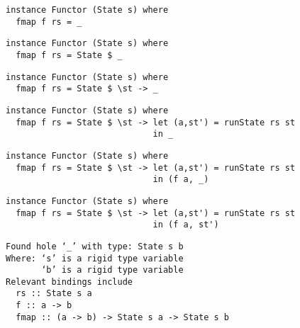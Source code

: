 \documentclass{beamer}
\begin{document}
\begin{frame}[fragile]
\begin{overprint}
\begin{verbatim}
instance Functor (State s) where
  fmap f rs = _

\end{verbatim}
\begin{verbatim}
instance Functor (State s) where
  fmap f rs = State $ _

\end{verbatim}
\begin{verbatim}
instance Functor (State s) where
  fmap f rs = State $ \st -> _

\end{verbatim}
\begin{verbatim}
instance Functor (State s) where
  fmap f rs = State $ \st -> let (a,st') = runState rs st
                             in _
\end{verbatim}
\begin{verbatim}
instance Functor (State s) where
  fmap f rs = State $ \st -> let (a,st') = runState rs st
                             in (f a, _)
\end{verbatim}
\begin{verbatim}
instance Functor (State s) where
  fmap f rs = State $ \st -> let (a,st') = runState rs st
                             in (f a, st')
\end{verbatim}
\end{overprint}
\bigskip
\scriptsize
\begin{overprint}
\begin{verbatim}
Found hole ‘_’ with type: State s b
Where: ‘s’ is a rigid type variable
       ‘b’ is a rigid type variable
Relevant bindings include
  rs :: State s a
  f :: a -> b
  fmap :: (a -> b) -> State s a -> State s b
\end{verbatim}


\end{overprint}
\end{frame}
\end{document}

